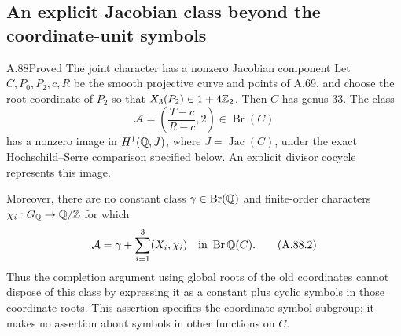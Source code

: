 \subsection{An explicit Jacobian class beyond the coordinate-unit symbols}

\begin{statement}{A.88}{Proved}
{The joint character has a nonzero Jacobian component}
Let $C,P_0,P_2,c,R$ be the smooth projective curve and points
of A.69, and choose the root coordinate of $P_2$ so that
$X_3(P_2)\in1+4\mathbb Z_2$.
Then $C$ has genus $33$.
The class
\[
 \mathcal A=\left(\frac{T-c}{R-c},2\right)\in\operatorname{Br}(C)
 \tag{A.88.1}
\]
has a nonzero image in $H^1(\mathbb Q,J)$, where $J=\operatorname{Jac}(C)$,
under the exact Hochschild--Serre comparison specified below.
An explicit divisor cocycle represents this image.

Moreover, there are no constant class $\gamma\in\operatorname{Br}(\mathbb Q)$
and finite-order characters
$\chi_i:G_\mathbb Q\to\mathbb Q/\mathbb Z$ for which
\[
             \mathcal A=\gamma+\sum_{i=1}^3(X_i,\chi_i)
                                   \quad\text{in }\operatorname{Br}\mathbb Q(C).
 \tag{A.88.2}
\]
Thus the completion argument using global roots of the old
coordinates cannot dispose of this class by expressing it as
a constant plus cyclic symbols in those coordinate roots.
This assertion specifies the coordinate-symbol subgroup;
it makes no assertion about symbols in other functions on $C$.
\end{statement}
